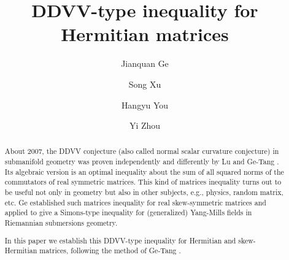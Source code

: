 \documentclass[a4paper,11pt]{amsart}
\title[DDVV inequality for Hermitian matrices]{DDVV-type inequality for Hermitian matrices}
\author[J.Q. Ge]{Jianquan Ge}
\author[S. Xu]{Song Xu}
\author[H. Y. You]{Hangyu You}
\author[Y. Zhou]{Yi Zhou}
\date{}
\numberwithin{equation}{section} \theoremstyle{plain}
\begin{document}
\maketitle

\begin{abstract}
About 2007, the DDVV conjecture (also called normal scalar curvature conjecture) in submanifold geometry was proven independently and differently by Lu \cite{Lu11} and Ge-Tang \cite{GT08}.
Its algebraic version is an optimal inequality about the sum of all squared norms of the commutators of real symmetric matrices.
This kind of matrices inequality turns out to be useful not only in geometry but also in other subjects, e.g., physics, random matrix, etc.
Ge \cite{Ge14} established such matrices inequality for real skew-symmetric matrices and applied to give a Simons-type inequality for (generalized) Yang-Mills fields in Riemannian submersions geometry.

In this paper we establish this DDVV-type inequality for Hermitian and skew-Hermitian matrices, following the method of Ge-Tang \cite{GT08}.
\end{abstract}
\end{document}
